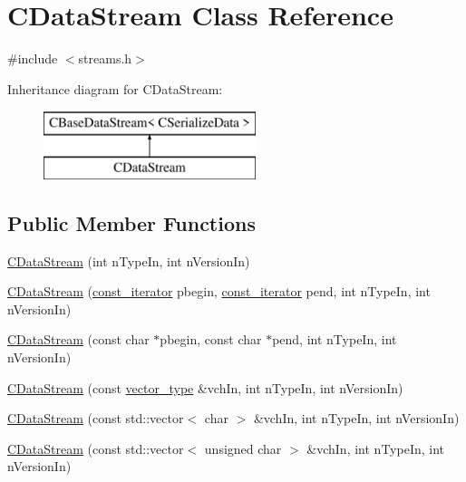 \hypertarget{class_c_data_stream}{}\section{C\+Data\+Stream Class Reference}
\label{class_c_data_stream}


{\ttfamily \#include $<$streams.\+h$>$}

Inheritance diagram for C\+Data\+Stream\+:\begin{figure}[H]
\begin{center}
\leavevmode
\includegraphics[height=2.000000cm]{class_c_data_stream}
\end{center}
\end{figure}
\subsection*{Public Member Functions}
\begin{DoxyCompactItemize}
\item 
\mbox{\hyperlink{class_c_data_stream_a38f4d7d2ae59566a0500523a1b1a49d4}{C\+Data\+Stream}} (int n\+Type\+In, int n\+Version\+In)
\item 
\mbox{\hyperlink{class_c_data_stream_a00d23d0ef651cb4ea54cb37009bdf8f2}{C\+Data\+Stream}} (\mbox{\hyperlink{class_c_base_data_stream_a9cf3080c5a75c94568980a59d3aab3ad}{const\+\_\+iterator}} pbegin, \mbox{\hyperlink{class_c_base_data_stream_a9cf3080c5a75c94568980a59d3aab3ad}{const\+\_\+iterator}} pend, int n\+Type\+In, int n\+Version\+In)
\item 
\mbox{\hyperlink{class_c_data_stream_ab345d2edd7bef6c6c140a46621e49eee}{C\+Data\+Stream}} (const char $\ast$pbegin, const char $\ast$pend, int n\+Type\+In, int n\+Version\+In)
\item 
\mbox{\hyperlink{class_c_data_stream_a38a51fefce23374963516b3af03638fc}{C\+Data\+Stream}} (const \mbox{\hyperlink{class_c_base_data_stream_a035e97a3e024a8cfa4690eaca1e5e290}{vector\+\_\+type}} \&vch\+In, int n\+Type\+In, int n\+Version\+In)
\item 
\mbox{\hyperlink{class_c_data_stream_a46219676397ae7b3cbc0c676f74ba1e7}{C\+Data\+Stream}} (const std\+::vector$<$ char $>$ \&vch\+In, int n\+Type\+In, int n\+Version\+In)
\item 
\mbox{\hyperlink{class_c_data_stream_ac63bd3d0ecce0edc2aa66cc80b633b6f}{C\+Data\+Stream}} (const std\+::vector$<$ unsigned char $>$ \&vch\+In, int n\+Type\+In, int n\+Version\+In)
\end{DoxyCompactItemize}
